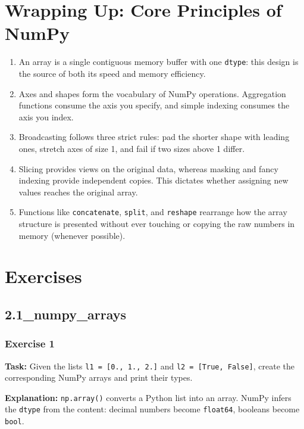 


\section{Wrapping Up: Core Principles of NumPy}
\begin{enumerate}
    \item An array is a single contiguous memory buffer with one \texttt{dtype}: this design is the source of both its speed and memory efficiency.
    \item Axes and shapes form the vocabulary of NumPy operations. Aggregation functions consume the axis you specify, and simple indexing consumes the axis you index.
    \item Broadcasting follows three strict rules: pad the shorter shape with leading ones, stretch axes of size 1, and fail if two sizes above 1 differ.
    \item Slicing provides views on the original data, whereas masking and fancy indexing provide independent copies. This dictates whether assigning new values reaches the original array.
    \item Functions like \texttt{concatenate}, \texttt{split}, and \texttt{reshape} rearrange how the array structure is presented without ever touching or copying the raw numbers in memory (whenever possible).
\end{enumerate}

\section{Exercises}

\subsection{2.1\_numpy\_arrays}

\subsubsection{Exercise 1}
\textbf{Task:} Given the lists \texttt{l1 = [0., 1., 2.]} and \texttt{l2 = [True, False]}, create the corresponding NumPy arrays and print their types.

\textbf{Explanation:} \texttt{np.array()} converts a Python list into an array. NumPy infers the \texttt{dtype} from the content: decimal numbers become \texttt{float64}, booleans become \texttt{bool}.

